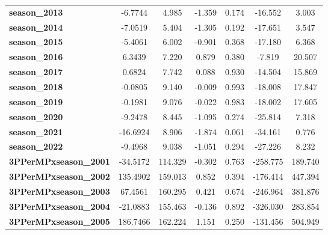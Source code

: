 \begin{center}
\begin{tabular}{lcccccc}
\textbf{season\_2013}         &      -6.7744  &        4.985     &    -1.359  &         0.174        &      -16.552    &        3.003     \\
\textbf{season\_2014}         &      -7.0519  &        5.404     &    -1.305  &         0.192        &      -17.651    &        3.547     \\
\textbf{season\_2015}         &      -5.4061  &        6.002     &    -0.901  &         0.368        &      -17.180    &        6.368     \\
\textbf{season\_2016}         &       6.3439  &        7.220     &     0.879  &         0.380        &       -7.819    &       20.507     \\
\textbf{season\_2017}         &       0.6824  &        7.742     &     0.088  &         0.930        &      -14.504    &       15.869     \\
\textbf{season\_2018}         &      -0.0805  &        9.140     &    -0.009  &         0.993        &      -18.008    &       17.847     \\
\textbf{season\_2019}         &      -0.1981  &        9.076     &    -0.022  &         0.983        &      -18.002    &       17.605     \\
\textbf{season\_2020}         &      -9.2478  &        8.445     &    -1.095  &         0.274        &      -25.814    &        7.318     \\
\textbf{season\_2021}         &     -16.6924  &        8.906     &    -1.874  &         0.061        &      -34.161    &        0.776     \\
\textbf{season\_2022}         &      -9.4968  &        9.038     &    -1.051  &         0.294        &      -27.226    &        8.232     \\
\textbf{3PPerMPxseason\_2001} &     -34.5172  &      114.329     &    -0.302  &         0.763        &     -258.775    &      189.740     \\
\textbf{3PPerMPxseason\_2002} &     135.4902  &      159.013     &     0.852  &         0.394        &     -176.414    &      447.394     \\
\textbf{3PPerMPxseason\_2003} &      67.4561  &      160.295     &     0.421  &         0.674        &     -246.964    &      381.876     \\
\textbf{3PPerMPxseason\_2004} &     -21.0883  &      155.463     &    -0.136  &         0.892        &     -326.030    &      283.854     \\
\textbf{3PPerMPxseason\_2005} &     186.7466  &      162.224     &     1.151  &         0.250        &     -131.456    &      504.949     \\

\end{tabular}
\end{center}

